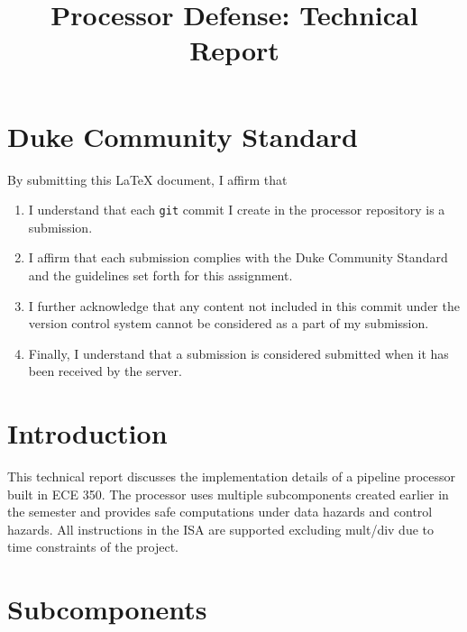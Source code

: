\documentclass[a4paper,11pt]{article}
\begin{document}



\title{Processor Defense: Technical Report}
\maketitle
\mbox{}
\vfill

\section*{Duke Community Standard}

By submitting this \LaTeX{} document, I affirm that
\begin{enumerate}
    \item I understand that each \texttt{git} commit I create in the processor repository is a submission.
    \item I affirm that each submission complies with the Duke Community Standard and the guidelines set forth for this assignment.
    \item I further acknowledge that any content not included in this commit under the version control system cannot be considered as a part of my submission.
    \item Finally, I understand that a submission is considered submitted when it has been received by the server.
\end{enumerate}

\newpage

\section*{Introduction}

This technical report discusses the implementation details of a pipeline processor built in ECE 350. The processor uses multiple subcomponents created earlier in the semester and provides safe computations under data hazards and control hazards. All instructions in the ISA are supported excluding mult/div due to time constraints of the project.

\section*{Subcomponents}
\setlength{\parindent}{0cm}
\end{document}
